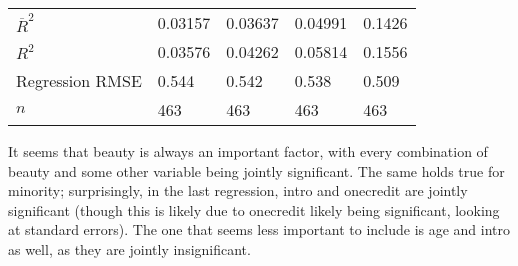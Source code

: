 \documentclass[12pt,letterpaper]{article}
\theoremstyle{definition}
\begin{document}
\begin{table}[H]
\begin{tabular}{@{}lllll@{}}
    \midrule
    $\overline{R}^{2}$                                  & 0.03157    & 0.03637    & 0.04991    & 0.1426      \\
    $R^{2}$                                             & 0.03576    & 0.04262    & 0.05814    & 0.1556      \\
    Regression RMSE                                     & 0.544      & 0.542      & 0.538      & 0.509       \\
    $n$                                                 & 463        & 463        & 463        & 463         \\
    \bottomrule
  \end{tabular}
\end{table}

It seems that beauty is always an important factor, with every combination of beauty and some other variable being jointly significant. The same holds true for minority; surprisingly, in the last regression, intro and onecredit are jointly significant (though this is likely due to onecredit likely being significant, looking at standard errors). The one that seems less important to include is age and intro as well, as they are jointly insignificant.
\end{document}
